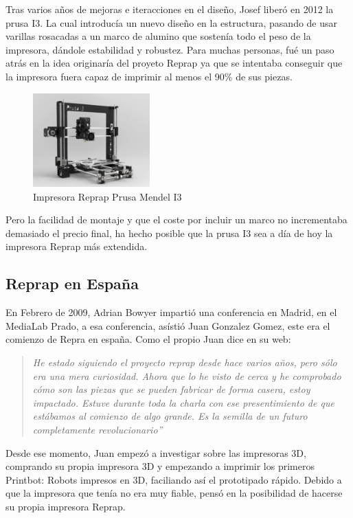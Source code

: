 Tras varios años de mejoras e iteracciones en el diseño, Josef liberó en 2012 la prusa I3. La cual introducía un nuevo diseño en la estructura, pasando de usar varillas rosacadas a un marco de alumino que sostenía todo el peso de la impresora, dándole estabilidad y robustez. Para muchas personas, fué un paso atrás en la idea originaría del proyeto Reprap ya que se intentaba conseguir que la impresora fuera capaz de imprimir al menos el 90\% de sus piezas.

\begin{figure}[H]
        \centering
        \includegraphics[width=0.4\textwidth]{images/prusa_i3.png}
        \caption{Impresora Reprap Prusa Mendel I3}
        \label{fig:estado_i3}
\end{figure}

Pero la facilidad de montaje y que el coste por incluir un marco no incrementaba demasiado el precio final, ha hecho posible que la prusa I3 sea a día de hoy la impresora Reprap más extendida.
\subsection{Reprap en España}

En Febrero de 2009, Adrian Bowyer impartió una conferencia en Madrid, en el MediaLab Prado, a esa conferencia, asístió Juan Gonzalez Gomez, este era el comienzo de Repra en españa. Como el propio Juan dice en su web\cite{juan1}:

\begin{quotation}
\emph{
He estado siguiendo el proyecto reprap desde hace varios años, pero sólo era una mera
curiosidad. Ahora que lo he visto de cerca y he comprobado cómo son las piezas que se
pueden fabricar de forma casera, estoy impactado. Estuve durante toda la charla con ese 
presentimiento de que estábamos al comienzo de algo grande. Es la semilla de un futuro
completamente revolucionario”}
\end{quotation}

Desde ese momento, Juan empezó a investigar sobre las impresoras 3D, comprando su propia impresora 3D\cite{juanR1} y empezando a imprimir los primeros Printbot: Robots impresos en 3D, faciliando así el prototipado rápido. Debido a que la impresora que tenía no era muy fiable, pensó en la posibilidad de hacerse su propia impresora Reprap.\\

